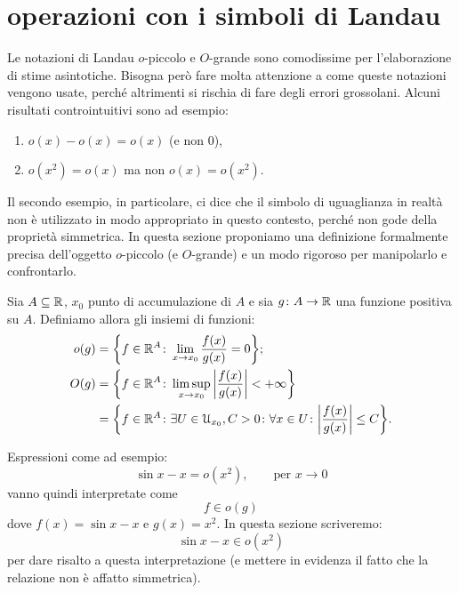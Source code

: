 \section{operazioni con i simboli di Landau}
\label{sec:landau}

Le
%
%
%
%
%
%
notazioni di Landau $o$-piccolo e $O$-grande sono comodissime per
l'elaborazione di stime asintotiche. Bisogna però fare molta attenzione a come queste notazioni vengono usate, perché altrimenti si rischia di fare degli errori grossolani. Alcuni risultati controintuitivi sono ad esempio:
\begin{enumerate}
\item $o(x) - o(x) = o(x)$ (e non $0$),
\item $o(x^2) = o(x)$ ma non $o(x) = o(x^2)$.
\end{enumerate}

Il secondo esempio, in particolare, ci dice che il simbolo di uguaglianza in realtà non è utilizzato in modo appropriato in questo contesto, perché non gode della proprietà simmetrica. In questa sezione proponiamo una definizione formalmente precisa dell'oggetto $o$-piccolo (e $O$-grande) e un modo rigoroso per manipolarlo e confrontarlo.

\begin{definition}
Sia $A\subseteq {\mathbb R}$, $x_0$ punto di accumulazione di $A$
e sia $g\colon A \to {\mathbb R}$ una funzione positiva su $A$.
Definiamo allora gli insiemi di funzioni:
\begin{align*}
  o(g) &= {\left\{ f\in {\mathbb R}^A \colon \lim_{x\to x_0}\frac{f(x)}{g(x)} = 0 \right\}};\\
  O(g) &= {\left\{ f\in {\mathbb R}^A \colon \limsup_{x\to x_0}{\left|\frac{f(x)}{g(x)}\right|} < + \infty \right\}}\\
       &= {\left\{ f\in {\mathbb R}^A \colon \exists U\in \mathcal U_{x_0}, C>0 \colon \forall x \in U\colon {\left|\frac{f(x)}{g(x)}\right|}\le C \right\}}.
\end{align*}
\end{definition}

Espressioni come ad esempio:
\[
  \sin x - x = o(x^2), \qquad \text{per $x\to 0$}
\]
vanno quindi interpretate come
\[
  f \in o(g)
\]
dove $f(x) = \sin x -x $ e $g(x) = x^2$.
In questa sezione scriveremo:
\begin{equation}\label{eq:39523}
  \sin x - x \in o(x^2)
\end{equation}
per dare risalto a questa interpretazione (e mettere in evidenza il fatto che la relazione non è affatto simmetrica).

